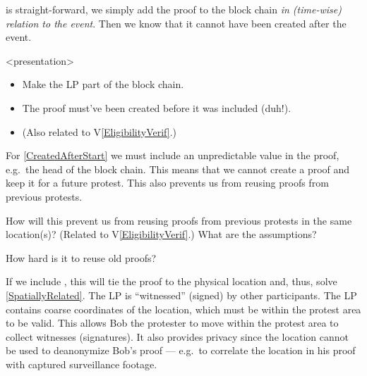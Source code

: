  is straight-forward, we simply add the proof to the 
block chain \emph{in (time-wise) relation to the event}.
Then we know that it cannot have been created after the event.

\begin{frame}<presentation>
  \begin{solution}
    \begin{itemize}
      \item Make the \ac{LP} part of the block chain.
      \item The proof must've been created before it was included (duh!).
      \item (Also related to V\ref{EligibilityVerif}.)
    \end{itemize}
  \end{solution}
\end{frame}

For \cref{CreatedAfterStart} we must include an unpredictable value in the 
proof, e.g.\ the head of the block chain.
This means that we cannot create a proof and keep it for a future protest.
This also prevents us from reusing proofs from previous protests.

\begin{frame}

  \pause

  \begin{question}
    How will this prevent us from reusing proofs from previous protests in 
    the same location(s)?
    (Related to V\ref{EligibilityVerif}.)
    What are the assumptions?
  \end{question}
  \begin{question}
    How hard is it to reuse old proofs?
  \end{question}
\end{frame}

If we include , this will tie the proof to the physical location and, 
thus, solve \cref{SpatiallyRelated}.
The \ac{LP} is \enquote{witnessed} (signed) by other participants.
The \ac{LP} contains coarse coordinates of the location, which must be within 
the protest area to be valid.
This allows Bob the protester to move within the protest area to collect 
witnesses (signatures).
It also provides privacy since the location cannot be used to deanonymize Bob's 
proof --- e.g.\ to correlate the location in his proof with captured 
surveillance footage.

